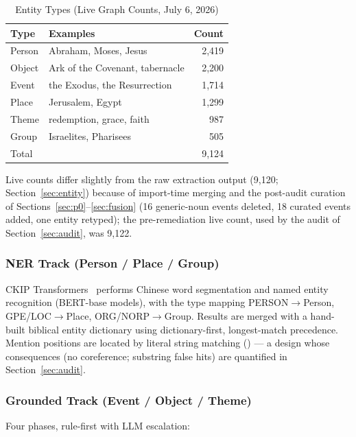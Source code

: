 \begin{table}[!t]
\caption{Entity Types (Live Graph Counts, July 6, 2026)}
\label{tab:entities}
\centering
\begin{threeparttable}
\begin{tabular}{llr}
\toprule
Type & Examples & Count \\
\midrule
Person & Abraham, Moses, Jesus & 2{,}419 \\
Object & Ark of the Covenant, tabernacle & 2{,}200 \\
Event  & the Exodus, the Resurrection & 1{,}714 \\
Place  & Jerusalem, Egypt & 1{,}299 \\
Theme  & redemption, grace, faith & 987 \\
Group  & Israelites, Pharisees & 505 \\
\midrule
Total  & & 9{,}124 \\
\bottomrule
\end{tabular}
\begin{tablenotes}\footnotesize
\item Live counts differ slightly from the raw extraction output
(9{,}120; Section~\ref{sec:entity}) because of import-time merging and
the post-audit curation of Sections~\ref{sec:p0}--\ref{sec:fusion}
(16 generic-noun events deleted, 18 curated events added, one entity
retyped); the pre-remediation live count, used by the audit of
Section~\ref{sec:audit}, was 9{,}122.
\end{tablenotes}
\end{threeparttable}
\end{table}

\subsubsection{NER Track (Person / Place / Group)}
CKIP Transformers~\cite{ckip} performs Chinese word segmentation and named
entity recognition (BERT-base models), with the type mapping
PERSON$\to$Person, GPE/LOC$\to$Place, ORG/NORP$\to$Group. Results are
merged with a hand-built biblical entity dictionary using
dictionary-first, longest-match precedence. Mention positions are located
by literal string matching () --- a design whose
consequences (no coreference; substring false hits) are quantified in
Section~\ref{sec:audit}.

\subsubsection{Grounded Track (Event / Object / Theme)}
Four phases, rule-first with LLM escalation:

